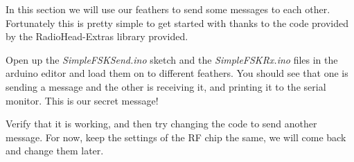 In this section we will use our feathers to send some messages to each other. Fortunately this is pretty simple to get started with thanks to the code provided by the RadioHead-Extras library provided.

Open up the \textit{SimpleFSKSend.ino} sketch and the \textit{SimpleFSKRx.ino} files in the arduino editor and load them on to different feathers. You should see that one is sending a message and the other is receiving it, and printing it to the serial monitor. This is our secret message!

Verify that it is working, and then try changing the code to send another message. For now, keep the settings of the \gls{RF} chip the same, we will come back and change them later.